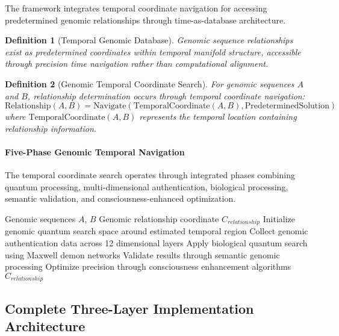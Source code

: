 \documentclass[12pt,a4paper]{article}
\newtheorem{definition}{Definition}
\begin{document}
The framework integrates temporal coordinate navigation for accessing predetermined genomic relationships through time-as-database architecture.

\begin{definition}[Temporal Genomic Database]
Genomic sequence relationships exist as predetermined coordinates within temporal manifold structure, accessible through precision time navigation rather than computational alignment.
\end{definition}

\begin{definition}[Genomic Temporal Coordinate Search]
For genomic sequences $A$ and $B$, relationship determination occurs through temporal coordinate navigation:
\begin{equation}
\text{Relationship}(A,B) = \text{Navigate}(\text{TemporalCoordinate}(A,B), \text{PredeterminedSolution})
\end{equation}
where $\text{TemporalCoordinate}(A,B)$ represents the temporal location containing relationship information.
\end{definition}

\paragraph{Five-Phase Genomic Temporal Navigation}

The temporal coordinate search operates through integrated phases combining quantum processing, multi-dimensional authentication, biological processing, semantic validation, and consciousness-enhanced optimization.

\begin{algorithm}[H]
\caption{Genomic Temporal Coordinate Navigation}
\begin{algorithmic}[1]
\REQUIRE Genomic sequences $A$, $B$
\ENSURE Genomic relationship coordinate $C_{relationship}$
\STATE Initialize genomic quantum search space around estimated temporal region
\STATE Collect genomic authentication data across 12 dimensional layers
\STATE Apply biological quantum search using Maxwell demon networks
\STATE Validate results through semantic genomic processing
\STATE Optimize precision through consciousness enhancement algorithms  
\RETURN $C_{relationship}$
\end{algorithmic}
\end{algorithm}

\subsection{Complete Three-Layer Implementation Architecture}
\end{document}
